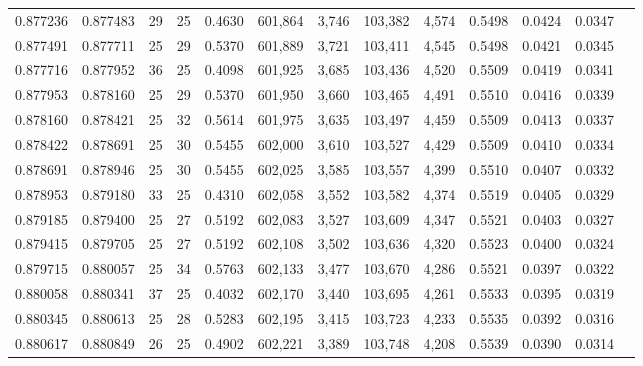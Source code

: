 \begin{tabular}{rrrrrrrrrrrrr}
0.877236 & 0.877483 &    29 &  25 &                                     0.4630 & 601,864 &   3,746 & 103,382 &   4,574 & 0.5498 & 0.0424 & 0.0347 \\
0.877491 & 0.877711 &    25 &  29 &                                     0.5370 & 601,889 &   3,721 & 103,411 &   4,545 & 0.5498 & 0.0421 & 0.0345 \\
0.877716 & 0.877952 &    36 &  25 &                                     0.4098 & 601,925 &   3,685 & 103,436 &   4,520 & 0.5509 & 0.0419 & 0.0341 \\
0.877953 & 0.878160 &    25 &  29 &                                     0.5370 & 601,950 &   3,660 & 103,465 &   4,491 & 0.5510 & 0.0416 & 0.0339 \\
0.878160 & 0.878421 &    25 &  32 &                                     0.5614 & 601,975 &   3,635 & 103,497 &   4,459 & 0.5509 & 0.0413 & 0.0337 \\
0.878422 & 0.878691 &    25 &  30 &                                     0.5455 & 602,000 &   3,610 & 103,527 &   4,429 & 0.5509 & 0.0410 & 0.0334 \\
0.878691 & 0.878946 &    25 &  30 &                                     0.5455 & 602,025 &   3,585 & 103,557 &   4,399 & 0.5510 & 0.0407 & 0.0332 \\
0.878953 & 0.879180 &    33 &  25 &                                     0.4310 & 602,058 &   3,552 & 103,582 &   4,374 & 0.5519 & 0.0405 & 0.0329 \\
0.879185 & 0.879400 &    25 &  27 &                                     0.5192 & 602,083 &   3,527 & 103,609 &   4,347 & 0.5521 & 0.0403 & 0.0327 \\
0.879415 & 0.879705 &    25 &  27 &                                     0.5192 & 602,108 &   3,502 & 103,636 &   4,320 & 0.5523 & 0.0400 & 0.0324 \\
0.879715 & 0.880057 &    25 &  34 &                                     0.5763 & 602,133 &   3,477 & 103,670 &   4,286 & 0.5521 & 0.0397 & 0.0322 \\
0.880058 & 0.880341 &    37 &  25 &                                     0.4032 & 602,170 &   3,440 & 103,695 &   4,261 & 0.5533 & 0.0395 & 0.0319 \\
0.880345 & 0.880613 &    25 &  28 &                                     0.5283 & 602,195 &   3,415 & 103,723 &   4,233 & 0.5535 & 0.0392 & 0.0316 \\
0.880617 & 0.880849 &    26 &  25 &                                     0.4902 & 602,221 &   3,389 & 103,748 &   4,208 & 0.5539 & 0.0390 & 0.0314 \\

\end{tabular}
